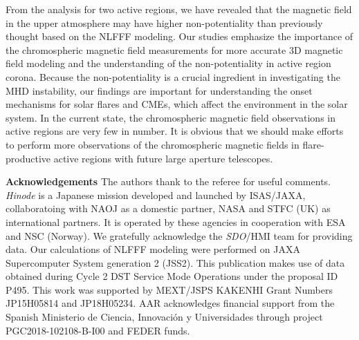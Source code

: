 \documentclass[manuscript]{aastex61}
\begin{document}
From the analysis for two active regions, we have revealed that the magnetic 
field in the upper atmosphere may have higher non-potentiality than previously 
thought based on the NLFFF modeling.
Our studies emphasize the importance of the chromospheric magnetic field measurements 
for more accurate 3D magnetic field modeling and the understanding of the 
non-potentiality in active region corona.
Because the non-potentiality is a crucial ingredient in investigating the MHD instability, 
our findings are important for understanding the onset mechanisms for solar flares
and CMEs, which affect the environment in the solar system.
In the current state, the chromospheric magnetic field observations in active regions 
are very few in number.
It is obvious that we should make efforts to perform more observations
of the chromospheric magnetic fields in flare-productive active regions with 
future large aperture telescopes.

{\bf Acknowledgements}
The authors thank to the referee for useful comments.
{\it Hinode} is a Japanese mission developed and launched by ISAS/JAXA,
collaboratoing with NAOJ as a domestic partner, NASA and STFC (UK) as
international partners. It is operated by these agencies in cooperation with ESA
and NSC (Norway). We gratefully acknowledge the {\it SDO}/HMI team for providing
data. Our calculations of NLFFF modeling were performed on JAXA Supercomputer
System generation 2 (JSS2). This publication makes use of data obtained during
Cycle 2 DST Service Mode Operations under the proposal ID P495. This work was
supported by MEXT/JSPS KAKENHI Grant Numbers JP15H05814 and JP18H05234. AAR acknowledges financial 
support from the Spanish Ministerio de Ciencia, Innovaci\'on y Universidades 
through project PGC2018-102108-B-I00 and FEDER funds.
\end{document}
